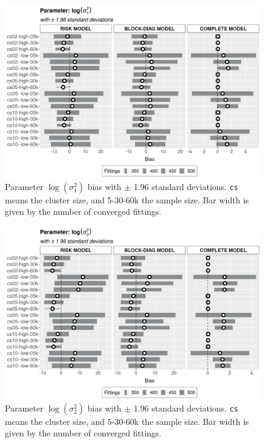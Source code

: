 \documentclass[a4paper,12pt]{article}
\begin{document}
\vspace{-0.514cm}
\begin{figure}[H]
 \centering
 \includegraphics[width=\linewidth]{pics/bias2plotsd-7.png}
 \vspace{-0.75cm}
 \caption{Parameter \(\log(\sigma_{1}^{2})\) bias with \(\pm\) 1.96
   standard deviations. \texttt{cs} means the cluster size, and 5-30-60k
   the sample size. Bar width is given by the number of converged
   fittings.}
 \label{fig:biassdlogs2_1}
\end{figure}

\begin{figure}[H]
 \centering
 \includegraphics[width=\linewidth]{pics/bias2plotsd-8.png}
 \vspace{-0.75cm}
 \caption{Parameter \(\log(\sigma_{2}^{2})\) bias with \(\pm\) 1.96
   standard deviations. \texttt{cs} means the cluster size, and 5-30-60k
   the sample size. Bar width is given by the number of converged
   fittings.}
 \label{fig:biassdlogs2_2}
\end{figure}
\end{document}
